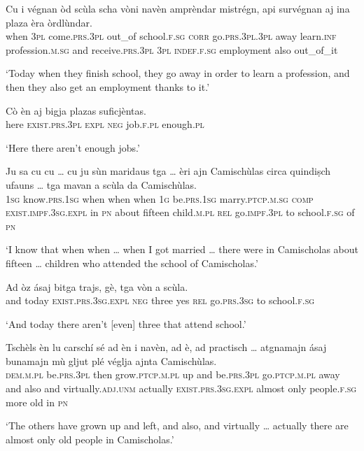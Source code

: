\begin{linenumbers}
	\gll    Cu i végnan òd scùla scha vòni navèn  amprèndar mistrégn, api survégnan aj ina plaza èra òrdlùndar.\\
	when \textsc{3pl} come.\textsc{prs.3pl} out\_of school.\textsc{f.sg} \textsc{corr} go.\textsc{prs.3pl.3pl} away learn.\textsc{inf} profession.\textsc{m.sg} and   receive.\textsc{prs.3pl} \textsc{3pl} \textsc{indef.f.sg} employment  also out\_of\_it  \\
\end{linenumbers}
\medskip
\glt `Today when they finish school, they go away in order to learn a profession, and then they also get an employment thanks to it.'
\medskip

\begin{linenumbers}
	\gll    Cò èn aj bigja plazas suficjèntas.\\
	here \textsc{exist.prs.3pl} \textsc{expl} \textsc{neg} job.\textsc{f.pl} enough.\textsc{pl} \\
\end{linenumbers}
\medskip
\glt `Here there aren’t enough jobs.'
\medskip

\begin{linenumbers}
	\gll    Ju sa cu cu … cu ju sùn maridaus tga … èri ajn Camischùlas circa quindiṣch ufauns … tga mavan a scùla da Camischùlas.\\
	\textsc{1sg} know.\textsc{prs.1sg} when when {} when \textsc{1g} be.\textsc{prs.1sg}  marry.\textsc{ptcp.m.sg} \textsc{comp} {} \textsc{exist.impf.3sg.expl} in \textsc{pn} about fifteen child.\textsc{m.pl} {} \textsc{rel} go.\textsc{impf.3pl} to school.\textsc{f.sg} of  \textsc{pn}\\
\end{linenumbers}
\medskip
\glt `I know that when when … when I got married … there were in Camischolas about fifteen … children who attended the school of Camischolas.'
\medskip

\begin{linenumbers}
	\gll    Ad òz ásaj bitga trajs, gè, tga vòn a scùla.\\
	and today \textsc{exist.prs.3sg.expl} \textsc{neg} three yes \textsc{rel} go.\textsc{prs.3sg} to school.\textsc{f.sg}\\
\end{linenumbers}
\medskip
\glt `And today there aren’t [even] three that attend school.'
\medskip

\begin{linenumbers}
	\gll    Tschèls èn lu carschí sé ad èn i navèn, ad è, ad practisch … atgnamajn ásaj bunamajn mù gljut plé véglja ajnta Camischùlas.\\
	\textsc{dem.m.pl} be.\textsc{prs.3pl} then grow.\textsc{ptcp.m.pl} up and be.\textsc{prs.3pl} go.\textsc{ptcp.m.pl} away and also and virtually.\textsc{adj.unm} {} actually \textsc{exist.prs.3sg.expl} almost only people.\textsc{f.sg} more old in \textsc{pn}  \\
\end{linenumbers}
\medskip
\glt `The others have grown up and left, and also, and virtually … actually there are almost only old people in Camischolas.'
\medskip

